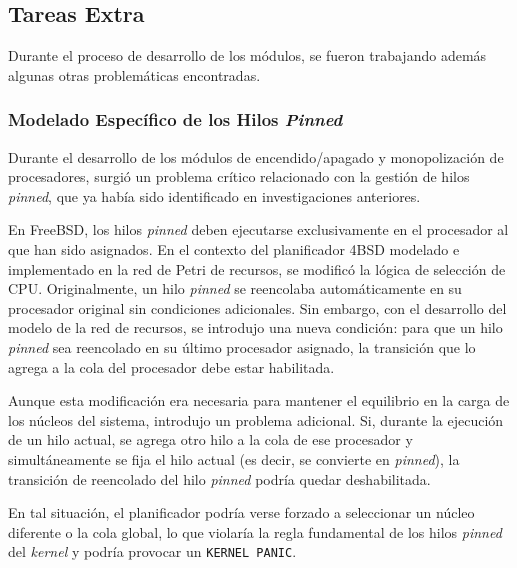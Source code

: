 \subsection{Tareas Extra}

Durante el proceso de desarrollo de los módulos, se fueron trabajando además algunas otras problemáticas encontradas.

\subsubsection{Modelado Específico de los Hilos \textit{Pinned}}

Durante el desarrollo de los módulos de encendido/apagado y monopolización de procesadores, surgió un problema crítico relacionado con la gestión de hilos \textit{pinned}, que ya había sido identificado en investigaciones anteriores.

En FreeBSD, los hilos \textit{pinned} deben ejecutarse exclusivamente en el procesador al que han sido asignados. En el contexto del planificador 4BSD modelado e implementado en la red de Petri de recursos, se modificó la lógica de selección de CPU. Originalmente, un hilo \textit{pinned} se reencolaba automáticamente en su procesador original sin condiciones adicionales. Sin embargo, con el desarrollo del modelo de la red de recursos, se introdujo una nueva condición: para que un hilo \textit{pinned} sea reencolado en su último procesador asignado, la transición que lo agrega a la cola del procesador debe estar habilitada.

Aunque esta modificación era necesaria para mantener el equilibrio en la carga de los núcleos del sistema, introdujo un problema adicional. Si, durante la ejecución de un hilo actual, se agrega otro hilo a la cola de ese procesador y simultáneamente se fija el hilo actual (es decir, se convierte en \textit{pinned}), la transición de reencolado del hilo \textit{pinned} podría quedar deshabilitada.

En tal situación, el planificador podría verse forzado a seleccionar un núcleo diferente o la cola global, lo que violaría la regla fundamental de los hilos \textit{pinned} del \textit{kernel} y podría provocar un \texttt{KERNEL PANIC}.



